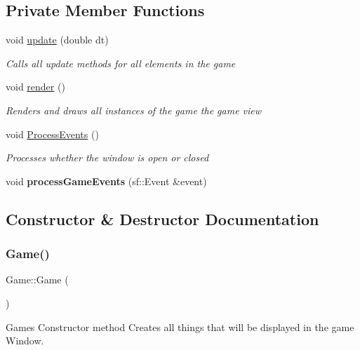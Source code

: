 \subsection*{Private Member Functions}
\begin{DoxyCompactItemize}
\item 
void \mbox{\hyperlink{class_game_aa8c8ca9efb596230614be2f2f9e61b86}{update}} (double dt)
\begin{DoxyCompactList}\small\item\em Calls all update methods for all elements in the game \end{DoxyCompactList}\item 
void \mbox{\hyperlink{class_game_a15ddd769261d923827a3cdf41499c843}{render}} ()
\begin{DoxyCompactList}\small\item\em Renders and draws all instances of the game the game view \end{DoxyCompactList}\item 
void \mbox{\hyperlink{class_game_ae7e28abc55af4902c9c39899708d08d7}{Process\+Events}} ()
\begin{DoxyCompactList}\small\item\em Processes whether the window is open or closed \end{DoxyCompactList}\item 
\mbox{\label{class_game_a7569931b96c10ae775569991f6f705bc}} 
void {\bfseries process\+Game\+Events} (sf\+::\+Event \&event)
\end{DoxyCompactItemize}


\subsection{Constructor \& Destructor Documentation}
\mbox{\label{class_game_ad59df6562a58a614fda24622d3715b65}} 
\subsubsection{\texorpdfstring{Game()}{Game()}}
{\footnotesize\ttfamily Game\+::\+Game (\begin{DoxyParamCaption}{ }\end{DoxyParamCaption})}



Games Constructor method Creates all things that will be displayed in the game Window. 



